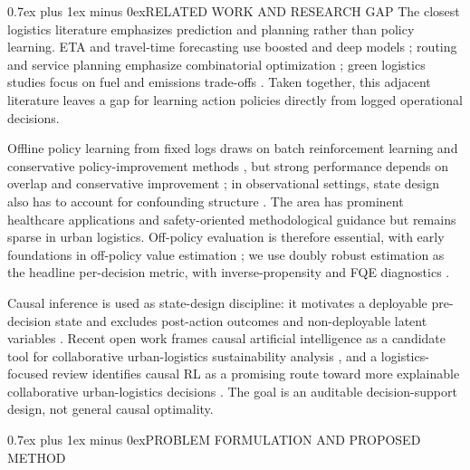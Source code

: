 \documentclass[a4paper,conference]{IEEEtran}
\makeatletter
\def\section{\@startsection{section}{1}{\z@}{1.5ex plus 1.5ex minus 0.5ex}%
  {0.7ex plus 1ex minus 0ex}{\normalfont\normalsize\centering}}
\makeatother
\begin{document}
\section{RELATED WORK AND RESEARCH GAP}
\label{sec:related}
The closest logistics literature emphasizes prediction and planning rather than policy learning. ETA and travel-time forecasting use boosted and deep models \cite{derrow2021eta,wang2019simple,li2018dcrnn}; routing and service planning emphasize combinatorial optimization \cite{toth2014vrp}; green logistics studies focus on fuel and emissions trade-offs \cite{dekker2012or,demir_green_2014,eglese2014green}. Taken together, this adjacent literature leaves a gap for learning action policies directly from logged operational decisions.

Offline policy learning from fixed logs draws on batch reinforcement learning and conservative policy-improvement methods \cite{levine2020offline,ernst2005tree,fujimoto2019bcq}, but strong performance depends on overlap and conservative improvement \cite{kumar2020cql,laroche2019spibb,thomas2015hcpi,prudencio2023survey}; in observational settings, state design also has to account for confounding structure \cite{pearl2009causality,hernan2020causal,lu2018deconfounding}. The area has prominent healthcare applications and safety-oriented methodological guidance \cite{komorowski2018sepsis,gottesman2019guidelines} but remains sparse in urban logistics. Off-policy evaluation is therefore essential, with early foundations in off-policy value estimation \cite{precup2000op}; we use doubly robust estimation as the headline per-decision metric, with inverse-propensity and FQE diagnostics \cite{dudik2011dr,jiang2016doubly,thomas2016dataefficient,le2019batch,kallus2020double}.

Causal inference is used as state-design discipline: it motivates a deployable pre-decision state and excludes post-action outcomes and non-deployable latent variables \cite{pearl2009causality,hernan2020causal,bareinboim2016causal,lu2018deconfounding}. Recent open work frames causal artificial intelligence as a candidate tool for collaborative urban-logistics sustainability analysis \cite{prayitno2024framework}, and a logistics-focused review identifies causal RL as a promising route toward more explainable collaborative urban-logistics decisions \cite{prayitno2024causalrlreview}. The goal is an auditable decision-support design, not general causal optimality.

\section{PROBLEM FORMULATION AND PROPOSED METHOD}
\label{sec:method}
\end{document}
